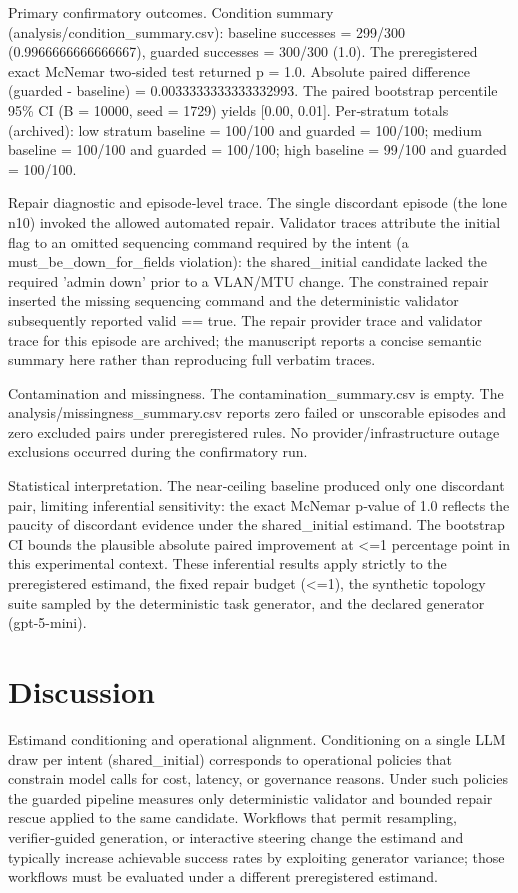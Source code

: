 \documentclass[conference]{IEEEtran}
\begin{document}
Primary confirmatory outcomes. Condition summary (analysis/condition\_summary.csv): baseline successes = 299/300 (0.9966666666666667), guarded successes = 300/300 (1.0). The preregistered exact McNemar two‑sided test returned p = 1.0. Absolute paired difference (guarded - baseline) = 0.0033333333333332993. The paired bootstrap percentile 95\% CI (B = 10000, seed = 1729) yields [0.00, 0.01]. Per‑stratum totals (archived): low stratum baseline = 100/100 and guarded = 100/100; medium baseline = 100/100 and guarded = 100/100; high baseline = 99/100 and guarded = 100/100.

Repair diagnostic and episode‑level trace. The single discordant episode (the lone n10) invoked the allowed automated repair. Validator traces attribute the initial flag to an omitted sequencing command required by the intent (a must\_be\_down\_for\_fields violation): the shared\_initial candidate lacked the required 'admin down' prior to a VLAN/MTU change. The constrained repair inserted the missing sequencing command and the deterministic validator subsequently reported valid == true. The repair provider trace and validator trace for this episode are archived; the manuscript reports a concise semantic summary here rather than reproducing full verbatim traces.

Contamination and missingness. The contamination\_summary.csv is empty. The analysis/missingness\_summary.csv reports zero failed or unscorable episodes and zero excluded pairs under preregistered rules. No provider/infrastructure outage exclusions occurred during the confirmatory run.

Statistical interpretation. The near‑ceiling baseline produced only one discordant pair, limiting inferential sensitivity: the exact McNemar p‑value of 1.0 reflects the paucity of discordant evidence under the shared\_initial estimand. The bootstrap CI bounds the plausible absolute paired improvement at <=1 percentage point in this experimental context. These inferential results apply strictly to the preregistered estimand, the fixed repair budget (<=1), the synthetic topology suite sampled by the deterministic task generator, and the declared generator (gpt-5-mini).

\section{Discussion}
Estimand conditioning and operational alignment. Conditioning on a single LLM draw per intent (shared\_initial) corresponds to operational policies that constrain model calls for cost, latency, or governance reasons. Under such policies the guarded pipeline measures only deterministic validator and bounded repair rescue applied to the same candidate. Workflows that permit resampling, verifier‑guided generation, or interactive steering change the estimand and typically increase achievable success rates by exploiting generator variance; those workflows must be evaluated under a different preregistered estimand.
\end{document}
